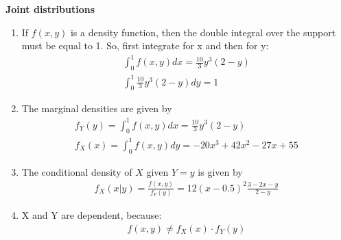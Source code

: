\begin{Solution}{8.1}
\textbf{Joint distributions}

\begin{enumerate}
\item If $f(x,y)$ is a density function, then the double integral over
    the support must be equal to 1. So, first integrate for x and then
    for y:
\begin{align*}
\int_0^1 f(x,y) dx = \frac{10}{3} y^3 (2-y)\\
\int_0^1 \frac{10}{3} y^3 (2-y) dy = 1
\end{align*}
\item The marginal densities are given by
\begin{align*}
f_Y(y) = \int_0^1 f(x,y) dx = \frac{10}{3} y^3 (2-y)\\
f_X(x) = \int_0^1 f(x,y) dy = -20 x^3 + 42x^2-27x+55
\end{align*}
\item The conditional density of $X$ given $Y=y$ is given by
\begin{align*}
f_X(x|y) =\frac{f(x,y)}{f_Y(y)} = 12(x-0.5)^2 \frac{3-2x-y}{2-y}
\end{align*}
\item X and Y are dependent, because:
\begin{align*}
f(x,y) \neq f_X(x)\cdot f_Y(y)
\end{align*}
\end{enumerate}
\end{Solution}
